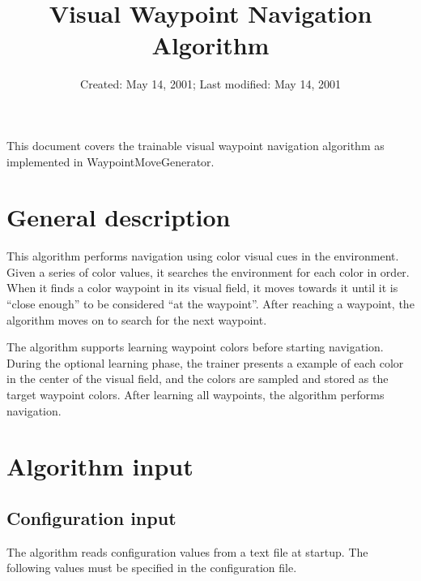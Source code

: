 \documentclass[12pt]{article}
\begin{document}
\title{Visual Waypoint Navigation Algorithm}
\date{Created: May 14, 2001;  Last modified: May 14, 2001}

\maketitle

This document covers the trainable visual waypoint navigation algorithm as implemented in WaypointMoveGenerator.

\section{General description}
This algorithm performs navigation using color visual cues in the environment.  Given a series of color values, it searches the environment for each color in order.  When it finds a color waypoint in its visual field, it moves towards it until it is ``close enough'' to be considered ``at the waypoint''.  After reaching a waypoint, the algorithm moves on to search for the next waypoint.

The algorithm supports learning waypoint colors before starting navigation.  During the optional learning phase, the trainer presents a example of each color in the center of the visual field, and the colors are sampled and stored as the target waypoint colors.  After learning all waypoints, the algorithm performs navigation.

\section{Algorithm input}
\subsection{Configuration input}
The algorithm reads configuration values from a text file at startup.  The following values must be specified in the configuration file.
\end{document}
